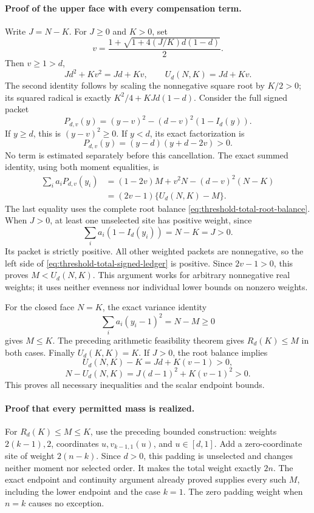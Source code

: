 \paragraph{Proof of the upper face with every compensation term.}
Write \(J=N-K\).  For \(J\ge0\) and \(K>0\), set
\[
 v=\frac{1+\sqrt{1+4(J/K)d(1-d)}}2.
\]
Then \(v\ge1>d\),
\begin{equation}
 Jd^2+Kv^2=Jd+Kv,
 \qquad U_d(N,K)=Jd+Kv.
 \label{eq:threshold-total-root-balance}
\end{equation}
The second identity follows by scaling the nonnegative square root by
\(K/2>0\); its squared radical is exactly
\(K^2/4+KJd(1-d)\).
Consider the full signed packet
\[
 P_{d,v}(y)=(y-v)^2-(d-v)^2(1-I_d(y)).
\]
If \(y\ge d\), this is \((y-v)^2\ge0\).
If \(y<d\), its exact factorization is
\[
 P_{d,v}(y)=(y-d)(y+d-2v)>0.
\]
No term is estimated separately before this cancellation.
The exact summed identity, using both moment equalities, is
\begin{align}
 \sum_i a_i P_{d,v}(y_i)
   &=(1-2v)M+v^2N-(d-v)^2(N-K)\\
   &=(2v-1)\{U_d(N,K)-M\}.
 \label{eq:threshold-total-signed-ledger}
\end{align}
The last equality uses the complete root balance
\eqref{eq:threshold-total-root-balance}.
When \(J>0\), at least one unselected site has positive weight, since
\[
 \sum_i a_i(1-I_d(y_i))=N-K=J>0.
\]
Its packet is strictly positive.  All other weighted packets are
nonnegative, so the left side of
\eqref{eq:threshold-total-signed-ledger} is positive.  Since \(2v-1>0\),
this proves \(M<U_d(N,K)\).
This argument works for arbitrary nonnegative real weights; it uses
neither evenness nor individual lower bounds on nonzero weights.

For the closed face \(N=K\), the exact variance identity
\[
 \sum_i a_i(y_i-1)^2=N-M\ge0
\]
gives \(M\le K\).  The preceding arithmetic feasibility theorem gives
\(R_d(K)\le M\) in both cases.
Finally \(U_d(K,K)=K\).  If \(J>0\), the root balance implies
\[
 U_d(N,K)-K=Jd+K(v-1)>0,
\]
\[
 N-U_d(N,K)=J(d-1)^2+K(v-1)^2>0.
\]
This proves all necessary inequalities and the scalar endpoint bounds.

\paragraph{Proof that every permitted mass is realized.}
For \(R_d(K)\le M\le K\), use the preceding bounded construction:
weights \(2(k-1),2\), coordinates \(u,v_{k-1,1}(u)\), and
\(u\in[d,1]\).  Add a zero-coordinate site of weight \(2(n-k)\).
Since \(d>0\), this padding is unselected and changes neither moment
nor selected order.  It makes the total weight exactly \(2n\).
The exact endpoint and continuity argument already proved supplies every
such \(M\), including the lower endpoint and the case \(k=1\).
The zero padding weight when \(n=k\) causes no exception.

